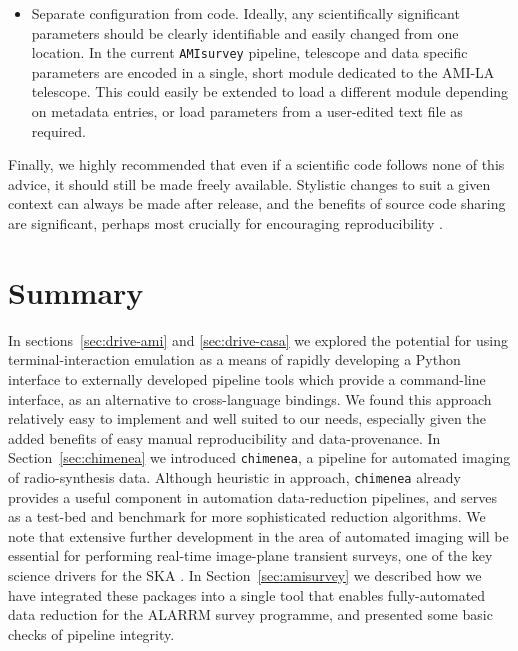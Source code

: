 \documentclass[5p,authoryear]{elsarticle}
\begin{document}
\begin{itemize}
 \item Separate configuration from code.
   Ideally, any scientifically significant parameters should be clearly identifiable and easily changed from one location. 
   In the current \texttt{AMIsurvey} pipeline, telescope and data specific parameters are encoded in a single, short module dedicated to the AMI-LA telescope. 
   This could easily be extended to load a different module depending on metadata entries, or load parameters from a user-edited text file as required.
\end{itemize}

Finally, we highly recommended that even if a scientific code follows none of this advice, it should still be made freely available. 
Stylistic changes to suit a given context can always be made after release, and the benefits of source code sharing are significant, perhaps most crucially for encouraging reproducibility \citep[see e.g.][for further discussion]{Shamir2013}.


\section{Summary}
\label{sec:conclusion}
In sections~\ref{sec:drive-ami} and \ref{sec:drive-casa} we explored the potential for using terminal-interaction emulation as a means of rapidly developing a Python interface to externally developed pipeline tools which provide a command-line interface, as an alternative to cross-language bindings. 
We found this approach relatively easy to implement and well suited to our needs, especially given the added benefits of easy manual reproducibility and data-provenance. 
In Section~\ref{sec:chimenea} we introduced \texttt{chimenea}, a pipeline for automated imaging of radio-synthesis data. 
Although heuristic in approach, \texttt{chimenea} already provides a useful component in automation data-reduction pipelines, and serves as a test-bed and benchmark for more sophisticated reduction algorithms. 
We note that extensive further development in the area of automated imaging will be essential for performing real-time image-plane transient surveys, one of the key science drivers for the SKA \citep{Burlon2015,Corbel2015,PerezTorres2014}.
In Section~\ref{sec:amisurvey} we described how we have integrated these packages into a single tool that enables fully-automated data reduction for the ALARRM survey programme, and presented some basic checks of pipeline integrity.
\end{document}
